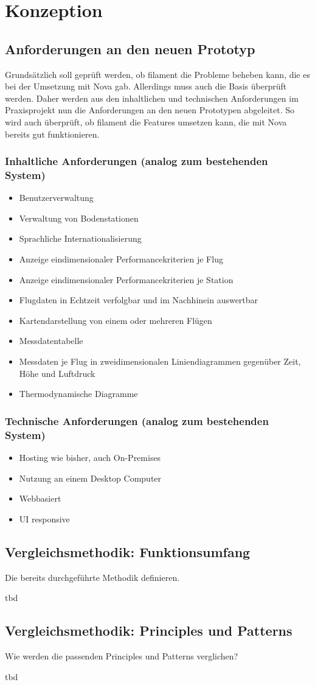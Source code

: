 \section{Konzeption}

\subsection{Anforderungen an den neuen Prototyp}

Grundsätzlich soll geprüft werden, ob filament die Probleme beheben kann, die es bei der Umsetzung mit Nova gab.
Allerdings muss auch die Basis überprüft werden.
Daher werden aus den inhaltlichen und technischen Anforderungen im Praxisprojekt nun die Anforderungen an den neuen Prototypen abgeleitet.
So wird auch überprüft, ob filament die Features umsetzen kann, die mit Nova bereits gut funktionieren.

\subsubsection{Inhaltliche Anforderungen (analog zum bestehenden System)}
\begin{itemize}
    \item Benutzerverwaltung
    \item Verwaltung von Bodenstationen
    \item Sprachliche Internationalisierung
    \item Anzeige eindimensionaler Performancekriterien je Flug
    \item Anzeige eindimensionaler Performancekriterien je Station
    \item Flugdaten in Echtzeit verfolgbar und im Nachhinein auswertbar
    \item Kartendarstellung von einem oder mehreren Flügen
    \item Messdatentabelle
    \item Messdaten je Flug in zweidimensionalen Liniendiagrammen gegenüber Zeit, Höhe und Luftdruck
    \item Thermodynamische Diagramme
\end{itemize}

\subsubsection{Technische Anforderungen (analog zum bestehenden System)}
\begin{itemize}
    \item Hosting wie bisher, auch On-Premises
    \item Nutzung an einem Desktop Computer
    \item Webbasiert
    \item UI responsive
\end{itemize}

\subsection{Vergleichsmethodik: Funktionsumfang}
\color{red}
Die bereits durchgeführte Methodik definieren.

tbd
\color{black}

\subsection{Vergleichsmethodik: Principles und Patterns}
\color{red}
Wie werden die passenden Principles und Patterns verglichen?

tbd
\color{black}
